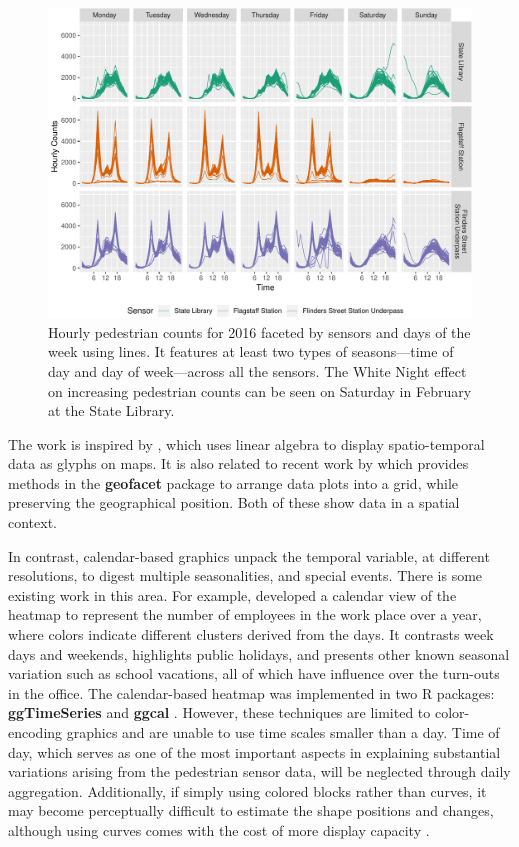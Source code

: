 \documentclass[12pt]{article}
\begin{document}
\begin{figure}

{\centering \includegraphics[width=\textwidth]{figure/facet-time-1} 

}

\caption{Hourly pedestrian counts for 2016 faceted by sensors and days of the week using lines. It features at least two types of seasons---time of day and day of week---across all the sensors. The White Night effect on increasing pedestrian counts can be seen on Saturday in February at the State Library.}\label{fig:facet-time}
\end{figure}

The work is inspired by \citet{Wickham2012glyph}, which uses linear
algebra to display spatio-temporal data as glyphs on maps. It is also
related to recent work by \citet{R-geofacet} which provides methods in
the \textbf{geofacet} package to arrange data plots into a grid, while
preserving the geographical position. Both of these show data in a
spatial context.

In contrast, calendar-based graphics unpack the temporal variable, at
different resolutions, to digest multiple seasonalities, and special
events. There is some existing work in this area. For example,
\citet{VanWijkCluster1999} developed a calendar view of the heatmap to
represent the number of employees in the work place over a year, where
colors indicate different clusters derived from the days. It contrasts
week days and weekends, highlights public holidays, and presents other
known seasonal variation such as school vacations, all of which have
influence over the turn-outs in the office. The calendar-based heatmap
was implemented in two R packages: \textbf{ggTimeSeries}
\citep{R-ggTimeSeries} and \textbf{ggcal} \citep{R-ggcal}. However,
these techniques are limited to color-encoding graphics and are unable
to use time scales smaller than a day. Time of day, which serves as one
of the most important aspects in explaining substantial variations
arising from the pedestrian sensor data, will be neglected through daily
aggregation. Additionally, if simply using colored blocks rather than
curves, it may become perceptually difficult to estimate the shape
positions and changes, although using curves comes with the cost of more
display capacity \citep{cleveland1984graphical, lam2007overview}.
\end{document}
